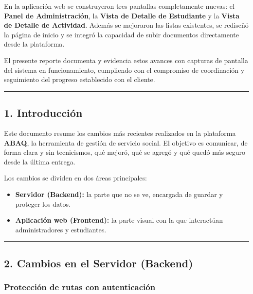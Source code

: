 \documentclass[
]{article}
\providecommand{\tightlist}{%
  \setlength{\itemsep}{0pt}\setlength{\parskip}{0pt}}
\begin{document}
En la aplicación web se construyeron tres pantallas completamente
nuevas: el \textbf{Panel de Administración}, la \textbf{Vista de Detalle
de Estudiante} y la \textbf{Vista de Detalle de Actividad}. Además se
mejoraron las listas existentes, se rediseñó la página de inicio y se
integró la capacidad de subir documentos directamente desde la
plataforma.

El presente reporte documenta y evidencia estos avances con capturas de
pantalla del sistema en funcionamiento, cumpliendo con el compromiso de
coordinación y seguimiento del progreso establecido con el cliente.

\begin{center}\rule{0.5\linewidth}{0.5pt}\end{center}

\subsection{1. Introducción}\label{introducciuxf3n}

Este documento resume los cambios más recientes realizados en la
plataforma \textbf{ABAQ}, la herramienta de gestión de servicio social.
El objetivo es comunicar, de forma clara y sin tecnicismos, qué mejoró,
qué se agregó y qué quedó más seguro desde la última entrega.

Los cambios se dividen en dos áreas principales:

\begin{itemize}
\tightlist
\item
  \textbf{Servidor (Backend):} la parte que no se ve, encargada de
  guardar y proteger los datos.
\item
  \textbf{Aplicación web (Frontend):} la parte visual con la que
  interactúan administradores y estudiantes.
\end{itemize}

\begin{center}\rule{0.5\linewidth}{0.5pt}\end{center}

\subsection{2. Cambios en el Servidor
(Backend)}\label{cambios-en-el-servidor-backend}

\subsubsection{Protección de rutas con
autenticación}\label{protecciuxf3n-de-rutas-con-autenticaciuxf3n}
\end{document}
